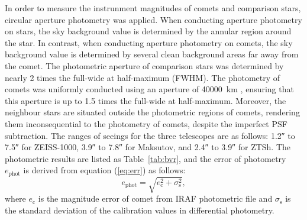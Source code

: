 In order to measure the  instrunment magnitudes of comets and comparison stars, circular aperture photometry was applied. When conducting aperture photometry on stars, the sky background value is determined by the annular region around the star. In contrast, when conducting aperture photometry on comets, the sky background value is determined by several clean background areas far away from the comet. The photometric aperture of comparison stars was determined by nearly \num{2} times the full-wide at half-maximum (FWHM). The photometry of comets was uniformly conducted using an aperture  of {\qty{40000}{\km}} , ensuring that this aperture is up to \num{1.5} times the full-wide at half-maximum. Moreover, the neighbour stars are situated outside the photometric regions of comets, rendering them inconsequential to the photometry of comets, despite the imperfect PSF subtraction. 
The ranges of seeings for the three telescopes are as follows: \ang{;;1.2} to \ang{;;7.5} for ZEISS-1000, \ang{;;3.9} to \ang{;;7.8} for Maksutov, and \ang{;;2.4} to \ang{;;3.9} for ZTSh. The photometric results are listed as Table~\ref{tab:bvr}, and the error of photometry $e_{\mathrm{phot}}$ is derived from equation (\ref{eq:err}) as follows: 
\begin{equation}
    e_{\mathrm{phot}} = \sqrt{e_{\mathrm{c}}^{2} + \sigma_\mathrm{s}^2}, 
    \label{eq:err}
\end{equation}
where $e_\mathrm{c}$ is the magnitude error of comet from IRAF photometric file and $\sigma_\mathrm{s}$ is the standard deviation of the calibration values in differential photometry. 






